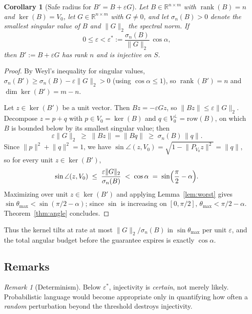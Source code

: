 \documentclass[11pt]{article}
\numberwithin{equation}{section}
\newtheorem{corollary}[theorem]{Corollary}
\theoremstyle{remark}
\newtheorem{remark}[theorem]{Remark}
\newcommand{\R}{\mathbb{R}}
\DeclareMathOperator{\rank}{rank}
\newcommand{\norm}[1]{\lVert #1\rVert}
\begin{document}
\begin{corollary}[Safe radius for $B'=B+\varepsilon G$]\label{cor:radius}
Let $B\in\R^{n\times m}$ with $\rank(B)=n$ and $\ker(B)=V_0$, let $G\in\R^{n\times m}$ with $G\ne 0$, and let $\sigma_n(B)>0$ denote the smallest singular value of $B$ and $\norm{G}_2$ the spectral norm. If
\[
0\le\varepsilon<\varepsilon^{*}:=\frac{\sigma_n(B)}{\norm{G}_2}\,\cos\alpha ,
\]
then $B':=B+\varepsilon G$ has rank $n$ and is injective on $S$.
\end{corollary}

\begin{proof}
By Weyl's inequality for singular values, $\sigma_n(B')\ge\sigma_n(B)-\varepsilon\norm{G}_2>0$ (using $\cos\alpha\le 1$), so $\rank(B')=n$ and $\dim\ker(B')=m-n$.

Let $z\in\ker(B')$ be a unit vector. Then $Bz=-\varepsilon Gz$, so $\norm{Bz}\le\varepsilon\norm{G}_2$. Decompose $z=p+q$ with $p\in V_0=\ker(B)$ and $q\in V_0^{\perp}=\mathrm{row}(B)$, on which $B$ is bounded below by its smallest singular value; then
\[
\varepsilon\norm{G}_2\;\ge\;\norm{Bz}=\norm{Bq}\;\ge\;\sigma_n(B)\,\norm{q}.
\]
Since $\norm{p}^2+\norm{q}^2=1$, we have $\sin\angle(z,V_0)=\sqrt{1-\norm{P_{V_0}z}^2}=\norm{q}$, so for every unit $z\in\ker(B')$,
\[
\sin\angle(z,V_0)\;\le\;\frac{\varepsilon\norm{G}_2}{\sigma_n(B)}\;<\;\cos\alpha\;=\;\sin\Bigl(\frac{\pi}{2}-\alpha\Bigr).
\]
Maximizing over unit $z\in\ker(B')$ and applying Lemma~\ref{lem:worst} gives $\sin\theta_{\max}<\sin(\pi/2-\alpha)$; since $\sin$ is increasing on $[0,\pi/2]$, $\theta_{\max}<\pi/2-\alpha$. Theorem~\ref{thm:angle} concludes.
\end{proof}

Thus the kernel tilts at rate at most $\norm{G}_2/\sigma_n(B)$ in $\sin\theta_{\max}$ per unit $\varepsilon$, and the total angular budget before the guarantee expires is exactly $\cos\alpha$.

\subsection{Remarks}

\begin{remark}[Determinism]
Below $\varepsilon^{*}$, injectivity is \emph{certain}, not merely likely. Probabilistic language would become appropriate only in quantifying how often a \emph{random} perturbation beyond the threshold destroys injectivity.
\end{remark}
\end{document}
